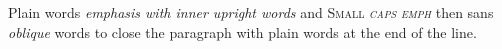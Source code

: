 \documentclass{article}
\begin{document}
Plain words \emph{emphasis with \emph{inner upright} words} and \textsc{Small \emph{caps emph}} then \textsf{sans \emph{oblique} words} to close the paragraph with plain words at the end of the line.
\end{document}
